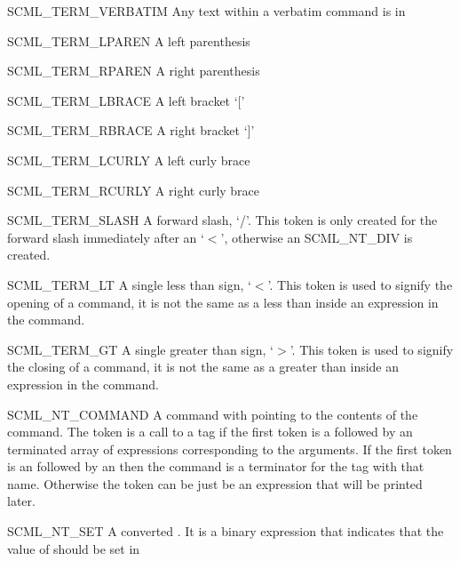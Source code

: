 \begin{cidentifierlist}
  \item[SCML_TERM_VERBATIM]
  Any text within a verbatim command is in 

  \item[SCML_TERM_LPAREN]
  A left parenthesis

  \item[SCML_TERM_RPAREN]
  A right parenthesis

  \item[SCML_TERM_LBRACE]
  A left bracket `['

  \item[SCML_TERM_RBRACE]
  A right bracket `]'

  \item[SCML_TERM_LCURLY]
  A left curly brace

  \item[SCML_TERM_RCURLY]
  A right curly brace

  \item[SCML_TERM_SLASH]
  A forward slash, `/'.  This token is only created for the forward slash
  immediately after an `$<$', otherwise an SCML\_NT\_DIV is created.

  \item[SCML_TERM_LT]
  A single less than sign, `$<$'.  This token is used to signify the opening of a
  command, it is not the same as a less than inside an expression in the
  command.

  \item[SCML_TERM_GT]
  A single greater than sign, `$>$'.  This token is used to signify the closing
  of a command, it is not the same as a greater than inside an expression in
  the command.

  \item[SCML_NT_COMMAND]
  A command with  pointing to the contents of the
  command.  The token is a call to a tag if the first token is a
   followed by an  terminated
  array of expressions corresponding to the arguments.  If the first token is
  an  followed by an 
  then the command is a terminator for the tag with that name.  Otherwise the
  token can be just be an expression that will be printed later.

  \item[SCML_NT_SET]
  A converted .  It is a binary expression that
  indicates that the value of  should be set in


\end{cidentifierlist}
